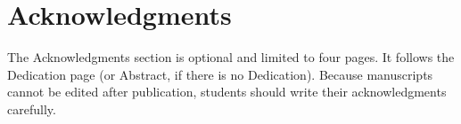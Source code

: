 \chapter[unnumbered=true]{Acknowledgments}

The Acknowledgments section is optional and limited to four pages.
It follows the Dedication page (or Abstract, if there is no Dedication).
Because manuscripts cannot be edited after publication, students should write their acknowledgments carefully.

